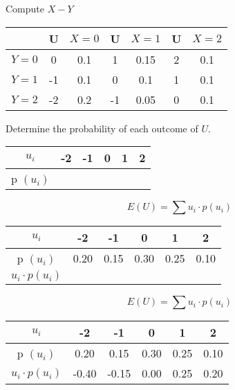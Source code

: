 \documentclass[]{report}
\begin{document}
	
	
	
	Compute $X-Y$
	\begin{center}
		\begin{tabular}{|c|cc|cc|cc|}
			\hline  & \phantom{sp}U \phantom{s}&$X=0$ &\phantom{sp}U \phantom{s} & $X=1$ & \phantom{sp}U\phantom{s}& $X=2$ \\ 
			\hline $Y=0$& 0 & 0.1 & 1 & 0.15 & 2& 0.1 \\ 
			\hline $Y=1$& -1& 0.1 & 0& 0.1 & 1& 0.1 \\ 
			\hline $Y=2$& -2 & 0.2 & -1 & 0.05 & 0 & 0.1 \\ 
			\hline 
		\end{tabular} 
	\end{center}
	\bigskip
	
	Determine the probability of each outcome of $U$.
	\\
	\begin{center}
		\begin{tabular}{|c|c|c|c|c|c|}
			\hline $u_i$ & -2 & -1  & 0 & 1 & 2 \\ 
			\hline p $(u_i)$ & \phantom{spaces} & \phantom{spaces} & \phantom{spaces} & \phantom{spaces} & \phantom{spaces} \\ 
			\hline 
		\end{tabular} 
	\end{center}
	
	
	
	
	
	\[ E(U) =  \sum  u_i \cdot p(u_i)   \]
	\begin{center}
		\begin{tabular}{|c|c|c|c|c|c|}
			\hline $u_i$ & -2 & -1  & 0 & 1 & 2 \\ 
			\hline p $(u_i)$ & \phantom{s}0.20\phantom{s} & \phantom{s}0.15\phantom{s}  & \phantom{s}0.30\phantom{s}  & \phantom{s}0.25\phantom{s} & \phantom{s}0.10\phantom{s} \\ 
			\hline 
			$u_i \cdot p (u_i)$ & & & & & \\\hline
		\end{tabular} 
	\end{center}
	
	
	
	\[ E(U) =  \sum  u_i \cdot p(u_i)   \]
	\begin{center}
		\begin{tabular}{|c|c|c|c|c|c|}
			\hline $u_i$ & -2 & -1  & 0 & 1 & 2 \\ 
			\hline p $(u_i)$ & \phantom{s}0.20\phantom{s} & \phantom{s}0.15\phantom{s}  & \phantom{s}0.30\phantom{s}  & \phantom{s}0.25\phantom{s} & \phantom{s}0.10\phantom{s} \\ 
			\hline 
			$u_i \cdot p (u_i)$ & -0.40 & -0.15 & 0.00 & 0.25 & 0.20 \\\hline
		\end{tabular} 
	\end{center}
	
\end{document}
